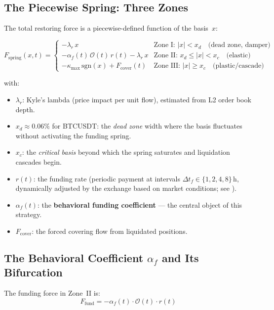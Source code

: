 \documentclass[11pt,a4paper]{article}
\newcommand{\af}{\alpha_f}
\newcommand{\Fspring}{F_{\mathrm{spring}}}
\newcommand{\Ffund}{F_{\mathrm{fund}}}
\newcommand{\Fcover}{F_{\mathrm{cover}}}
\newcommand{\OI}{\mathcal{O}}
\begin{document}
\subsection{The Piecewise Spring: Three Zones}
\label{sec:spring}

The total restoring force is a piecewise-defined function of the basis~$x$:

\begin{equation}
\label{eq:spring}
\Fspring(x,t) = 
\begin{cases}
-\lambda_r\,x & \text{Zone I: } |x| < x_d \quad \text{(dead zone, damper)}\\[6pt]
-\af(t)\,\OI(t)\,r(t) - \lambda_r\,x & \text{Zone II: } x_d \le |x| < x_c \quad \text{(elastic)}\\[6pt]
-\kappa_{\max}\,\mathrm{sgn}(x) + \Fcover(t) & \text{Zone III: } |x| \ge x_c \quad \text{(plastic/cascade)}
\end{cases}
\end{equation}

\noindent with:
\begin{itemize}[nosep]
    \item $\lambda_r$: Kyle's lambda (price impact per unit flow), estimated 
    from L2 order book depth.
    \item $x_d \approx 0.06\%$ for BTCUSDT: the \emph{dead zone} width where 
    the basis fluctuates without activating the funding spring.
    \item $x_c$: the \emph{critical basis} beyond which the spring saturates 
    and liquidation cascades begin.
    \item $r(t)$: the funding rate (periodic payment at intervals 
    $\Delta t_f \in \{1, 2, 4, 8\}$\,h, dynamically adjusted by the exchange
    based on market conditions; see ).
    \item $\af(t)$: the \textbf{behavioral funding coefficient} --- the central 
    object of this strategy.
    \item $\Fcover$: the forced covering flow from liquidated positions.
\end{itemize}


\subsection{The Behavioral Coefficient $\af$ and Its Bifurcation}
\label{sec:alphaf}

The funding force in Zone~II is:
\begin{equation}
\label{eq:ffund}
\Ffund = -\af(t) \cdot \OI(t) \cdot r(t)
\end{equation}
\end{document}
